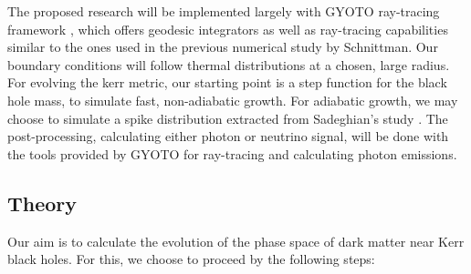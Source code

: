 \documentclass[12pt]{article}
\begin{document}

The proposed research will be implemented largely with GYOTO ray-tracing framework \citep{gyoto_vincent_2011}, which 
offers geodesic integrators as well as ray-tracing capabilities similar to the ones used in the previous numerical study by 
Schnittman. Our boundary conditions will follow thermal distributions at a chosen, large radius. 
For evolving the kerr metric, our starting point is a step function for the black hole mass, to simulate fast, 
non-adiabatic growth. %
For adiabatic growth, we may choose to simulate a spike distribution extracted from Sadeghian's 
study \citep{Sadeghian_Ferrer_Will_2013}. The post-processing, calculating either photon or neutrino signal, 
will be done with the tools provided by GYOTO for ray-tracing and 
calculating photon emissions.

\subsection{Theory} \label{ssec:theory}


Our aim is to calculate the evolution of the phase space of dark matter near Kerr black holes. For this, we choose to proceed by the 
following steps:
\end{document}

